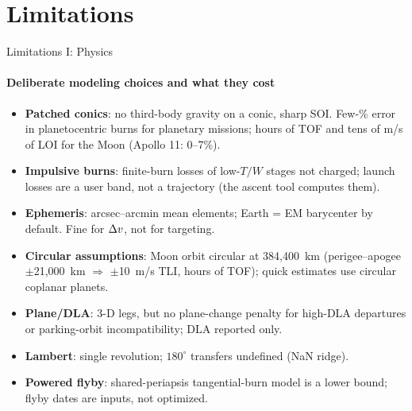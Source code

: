 \documentclass[aspectratio=169,10pt]{beamer}
\begin{document}
\section{Limitations}
\begin{frame}{Limitations I: Physics}
  \framesubtitle{Deliberate modeling choices and what they cost}
\begin{itemize}
\item \textbf{Patched conics}: no third-body gravity on a conic, sharp SOI. Few-\% error in planetocentric burns for planetary missions; hours of TOF and tens of m/s of LOI for the Moon (Apollo 11: 0--7\%).
\item \textbf{Impulsive burns}: finite-burn losses of low-$T/W$ stages not charged; launch losses are a user band, not a trajectory (the ascent tool computes them).
\item \textbf{Ephemeris}: arcsec--arcmin mean elements; Earth = EM barycenter by default. Fine for $\Delta v$, not for targeting.
\item \textbf{Circular assumptions}: Moon orbit circular at 384,400~km (perigee--apogee $\pm$21,000~km $\Rightarrow$ $\pm$10~m/s TLI, hours of TOF); quick estimates use circular coplanar planets.
\item \textbf{Plane/DLA}: 3-D legs, but no plane-change penalty for high-DLA departures or parking-orbit incompatibility; DLA reported only.
\item \textbf{Lambert}: single revolution; $180^\circ$ transfers undefined (NaN ridge).
\item \textbf{Powered flyby}: shared-periapsis tangential-burn model is a lower bound; flyby dates are inputs, not optimized.
\end{itemize}
\end{frame}
\end{document}
